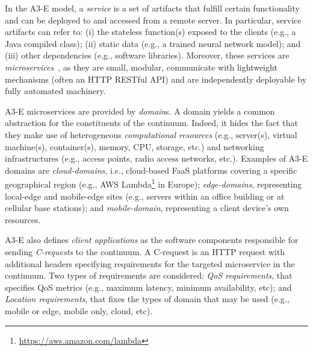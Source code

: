 In the A3-E model, a \textit{service} is a set of artifacts that fulfill certain functionality and can be deployed to and accessed from a remote server. In particular, service artifacts can refer to: (i) the stateless function(s) exposed to the clients (e.g., a Java compiled class); (ii) static data (e.g., a trained neural network model); and (iii) other dependencies (e.g.,  software libraries). Moreover, these services are \textit{microservices}~\cite{lewis2014microservices}, as they are small, modular, communicate with lightweight mechanisms (often an HTTP RESTful API) and are independently deployable by fully automated machinery. 

A3-E microservices are provided by \textit{domain}s. A domain yields a common abstraction for the constituents of the continuum. Indeed, it hides the fact that they make use of heterogeneous \textit{computational resources} (e.g., server(s), virtual machine(s), container(s), memory, CPU, storage, etc.) and networking infrastructures (e.g., access points, radio access networks, etc.). Examples of A3-E domains are \textit{cloud-domains}, i.e., cloud-based FaaS platforms covering a specific geographical region (e.g., AWS Lambda\footnote{\url{https://aws.amazon.com/lambda}} in Europe); \textit{edge-domains}, representing local-edge and mobile-edge sites (e.g., servers within an office building or at cellular base stations); and \textit{mobile-domain}, representing a client device's own resources.


A3-E also defines \textit{client applications} as the software components responsible for sending \textit{C-requests} to the continuum. A C-request is an HTTP request with additional headers specifying requirements for the targeted microservice in the continuum. Two types of requirements are considered: \textit{QoS requirements}, that specifies QoS metrics (e.g., maximum latency, minimum availability, etc); and \textit{Location requirements}, that fixes the types of domain that may be used (e.g., mobile or edge, mobile only, cloud, etc). 



